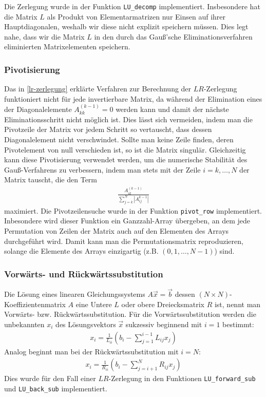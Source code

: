 \documentclass[10pt,a4paper]{article}
\begin{document}
Die Zerlegung wurde in der Funktion \texttt{LU\_decomp} implementiert. Insbesondere hat die Matrix $L$ als Produkt von Elementarmatrizen nur Einsen auf ihrer Hauptdiagonalen, weshalb wir diese nicht explizit speichern müssen. Dies legt nahe, dass wir die Matrix $L$ in den durch das Gauß'sche Eliminationsverfahren eliminierten Matrixelementen speichern.

\subsubsection{Pivotisierung}
\label{pivotisierung}
Das in \ref{lr-zerlegung} erklärte Verfahren zur Berechnung der $LR$-Zerlegung funktioniert nicht für jede invertierbare Matrix, da während der Elimination eines der Diagonalelemente $A^{(k-1)}_{kk} = 0$ werden kann und damit der nächste Eliminationsschritt nicht möglich ist. Dies lässt sich vermeiden, indem man die Pivotzeile der Matrix vor jedem Schritt so vertauscht, dass dessen Diagonalelement nicht verschwindet. Sollte man keine Zeile finden, deren Pivotelement von null verschieden ist, so ist die Matrix singulär. Gleichzeitig kann diese Pivotisierung verwendet werden, um die numerische Stabilität des Gauß-Verfahrens zu verbessern, indem man stets mit der Zeile $i = k, \dots, N$ der Matrix tauscht, die den Term
\begin{align}
	\frac{A^{(k-1)}_{ik}}{\sum_{j=k}^N \left|A^{k-1}_{ij}\right| }
\end{align}
maximiert. Die Pivotzeilensuche wurde in der Funktion \texttt{pivot\_row} implementiert. Inbesondere wird dieser Funktion ein Ganzzahl-Array übergeben, an dem jede Permutation von Zeilen der Matrix auch auf den Elementen des Arrays durchgeführt wird. Damit kann man die Permutationsmatrix reproduzieren, solange die Elemente des Arrays einzigartig (z.B. $(0, 1, \dots, N-1) $) sind.

\subsubsection{Vorwärts- und Rückwärtssubstitution}
Die Lösung eines linearen Gleichungssystems $A\vec{x} = \vec{b}$ dessen $(N \times N)$-Koeffizientenmatrix $A$ eine Untere $L$ oder obere Dreiecksmatrix $R$ ist, nennt man Vorwärts- bzw. Rückwärtssubstitution. Für die Vorwärtssubstitution werden die unbekannten $x_i$ des Lösungsvektors $\vec{x}$ sukzessiv beginnend mit $i = 1$ bestimmt:
\begin{align}
	x_i = \frac{1}{L_{ii}} \left( b_i - \sum_{j = 1}^{i-1} L_{ij} x_j \right)
\end{align}
Analog beginnt man bei der Rückwärtssubstitution mit $i = N$:
\begin{align}
	x_i = \frac{1}{R_{ii}} \left( b_i - \sum_{j=i+1}^{N} R_{ij} x_j \right)
\end{align}
Dies wurde für den Fall einer $LR$-Zerlegung in den Funktionen \texttt{LU\_forward\_sub} und \texttt{LU\_back\_sub} implementiert.
\end{document}
